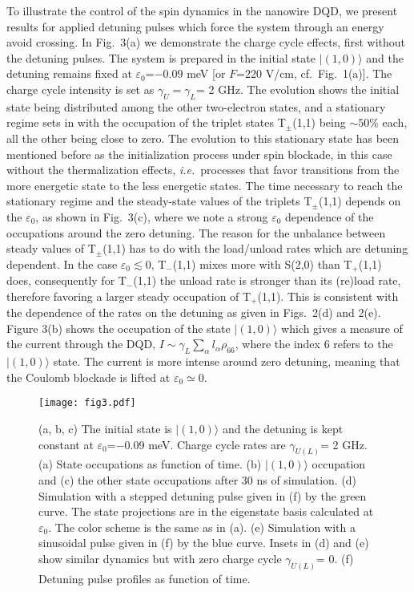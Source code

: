 \documentclass[prb,twocolumn,showpacs,floats]{revtex4}
\begin{document}
To illustrate the control of the spin dynamics in the nanowire DQD,  we present results for
 applied detuning pulses which force the system through an energy avoid crossing. In Fig.~3(a) we demonstrate the charge cycle effects, first without the
detuning pulses. The system is prepared in the initial
state $| (1,0) \rangle $ and the detuning remains fixed at 
$\varepsilon_0$=$-0.09$ meV [or $F$=220 V/cm, cf.~Fig.~1(a)].
The charge cycle intensity is set as $\gamma_U=\gamma_L$= 2 GHz.\cite{petta-prl}
The evolution shows the initial state being distributed among the other two-electron states,
and a stationary regime sets in with the occupation of the triplet states T$_\pm$(1,1) being $\sim 50\%$ each,
all the other being close to zero. The evolution to this stationary state
has been mentioned before as the initialization process under spin blockade, 
in this case without the thermalization effects,
\textit{i.e.}~processes that favor transitions from the more energetic state to the less energetic states.
The time necessary to reach the stationary regime and the steady-state values of the triplets T$_\pm$(1,1)
 depends on the $\varepsilon_0$, as shown in Fig.~3(c), where
we note a strong $\varepsilon_0$ dependence of the occupations around the zero detuning.
The reason for the unbalance between steady values of T$_\pm$(1,1) has to do
with the load/unload rates which are detuning dependent. In the case $\varepsilon_0 \lesssim 0$, T$_-$(1,1)
mixes more with S(2,0) than T$_+$(1,1) does, consequently for T$_-$(1,1) the unload rate is stronger
than its (re)load rate, therefore favoring a larger steady occupation of T$_+$(1,1).
This is consistent with the dependence of the rates on the detuning as given in Figs.~2(d) and 2(e). 
Figure 3(b) shows the occupation of the state
$| (1,0) \rangle $ which gives a measure of the current through the DQD, 
$I \sim \gamma_L \sum_\alpha l_\alpha  \rho_{66}$, where  the 
index 6 refers to the $| (1,0) \rangle $ state. The current is
more intense around zero detuning, meaning that the Coulomb blockade is lifted at $\varepsilon_0 \simeq 0$.

\begin{figure}[htbp]
\texttt{[image: fig3.pdf]} 
\caption{   (a, b, c) The initial state is  $| (1,0) \rangle $ and
the detuning is kept constant at $\varepsilon_0$=$-$0.09 meV. Charge cycle rates are 
$\gamma_{U(L)}$= 2 GHz. 
(a) State occupations as function of time. 
(b)  $| (1,0) \rangle $ occupation and
(c) the other state occupations after 30 ns of simulation.
(d) Simulation with a stepped detuning pulse given in (f) by the green curve. 
The state projections are in the eigenstate basis calculated at $\varepsilon_0$. 
The color scheme is the same as in (a).
(e) Simulation with a sinusoidal pulse given in (f) by the blue curve. 
Insets in (d) and (e) show similar dynamics but with zero charge cycle $\gamma_{U(L)}$= 0.
(f) Detuning pulse profiles as function of time.   }

\end{figure}
\end{document}
